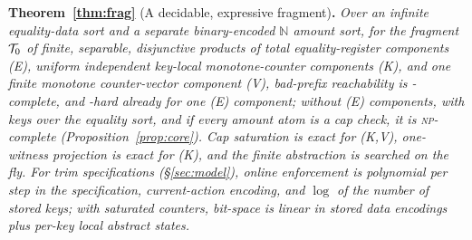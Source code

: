 \medskip
\noindent\textbf{Theorem~\ref{thm:frag}} (A decidable, expressive fragment)\textbf{.}
\emph{Over an infinite equality-data sort and a separate binary-encoded
$\mathbb N$ amount sort, for the fragment $\mathcal{T}_0$ of finite, separable, disjunctive products of total equality-register
components (E), uniform independent key-local monotone-counter components (K),
and one finite monotone counter-vector component (V), bad-prefix reachability is
\PSPACE-complete, and \PSPACE-hard already for one (E) component; without (E) components, with keys over the
equality sort, and if every amount atom is a cap check, it is \textsc{np}-complete (Proposition~\ref{prop:core}). Cap
saturation is exact for (K,V), one-witness projection is exact for (K), and the
finite abstraction is searched on the fly. For trim specifications (\S\ref{sec:model}), online enforcement is polynomial per
step in the specification, current-action encoding, and $\log$ of the number of
stored keys; with saturated counters,
bit-space is linear in stored data encodings plus per-key local abstract states.}

